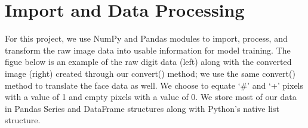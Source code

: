 \documentclass[10pt,parskip=half,
toc=sectionentrywithdots,
bibliography=totocnumbered,
captions=tableheading,numbers=noendperiod]{scrartcl}
\begin{document}
    \begingroup
    \let\cleardoublepage\relax
    \let\clearpage\relax
    \endgroup

\hypertarget{import-and-data-processing}{%
\section{Import and Data Processing}\label{import-and-data-processing}}

For this project, we use NumPy and Pandas modules to import, process,
and transform the raw image data into usable information for model
training. The figue below is an example of the raw digit data (left)
along with the converted image (right) created through our convert()
method; we use the same convert() method to translate the face data as
well. We choose to equate `\#' and `+' pixels with a value of 1 and
empty pixels with a value of 0. We store most of our data in Pandas
Series and DataFrame structures along with Python's native list
structure.
\end{document}
